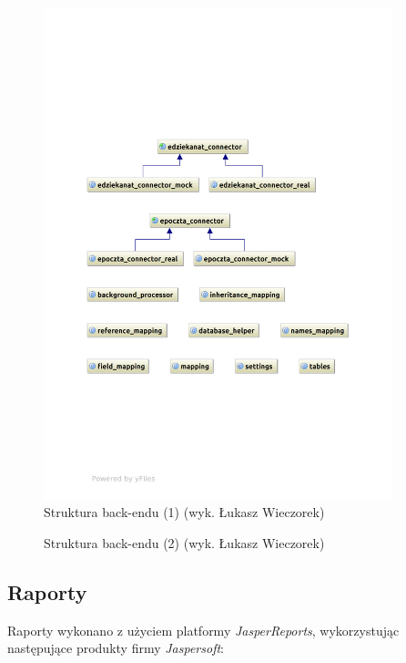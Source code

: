 \newpage
\begin{figure}[H]
\begin{center}
\includegraphics[width=0.9\textwidth]{figures/lw/backend1.pdf} 
\end{center}
\caption{Struktura back-endu (1) (wyk. Łukasz Wieczorek)}\label{rys:back-end1}
\end{figure}
\newpage
\begin{figure}[H]
\begin{center}
 
\end{center}
\caption{Struktura back-endu (2) (wyk. Łukasz Wieczorek)}\label{rys:back-end2}
\end{figure}
\newpage

\subsection{Raporty}
\label{Chapter661}

Raporty wykonano z użyciem platformy \textit{JasperReports}, wykorzystując następujące produkty firmy \textit{Jaspersoft}:

